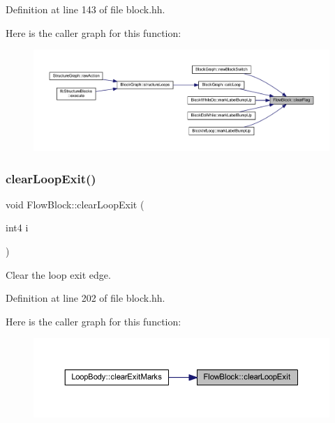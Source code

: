 Definition at line 143 of file block.\+hh.

Here is the caller graph for this function\+:
\nopagebreak
\begin{figure}[H]
\begin{center}
\leavevmode
\includegraphics[width=350pt]{class_flow_block_afd95b45dd6c78be77ad477386fe691db_icgraph}
\end{center}
\end{figure}
\mbox{\label{class_flow_block_ac71babec977453975a79a1eda20babf2}} 
\subsubsection{\texorpdfstring{clearLoopExit()}{clearLoopExit()}}
{\footnotesize\ttfamily void Flow\+Block\+::clear\+Loop\+Exit (\begin{DoxyParamCaption}\item[{int4}]{i }\end{DoxyParamCaption})\hspace{0.3cm}{\ttfamily [inline]}}



Clear the loop exit edge. 



Definition at line 202 of file block.\+hh.

Here is the caller graph for this function\+:
\nopagebreak
\begin{figure}[H]
\begin{center}
\leavevmode
\includegraphics[width=350pt]{class_flow_block_ac71babec977453975a79a1eda20babf2_icgraph}
\end{center}
\end{figure}
\mbox{\label{class_flow_block_ad8fe7973ef5e53753ea0695ea2d3b7be}} 
